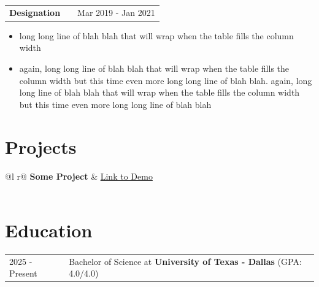 \documentclass[letterpaper,12pt]{article}
\makeatletter
\newenvironment{joblong}[2]
    {
    \begin{tabularx}{\linewidth}{@{}l X r@{}}
    \textbf{#1} & \hfill &  #2 \\[3.75pt]
    \end{tabularx}
    \begin{minipage}[t]{\linewidth}
    \begin{itemize}[nosep,after=\strut, leftmargin=1em, itemsep=3pt,label=--]
    }
    {
    \end{itemize}
    \end{minipage}    
    }
\makeatother
\begin{document}
\begin{joblong}{Designation}{Mar 2019 - Jan 2021}
\item long long line of blah blah that will wrap when the table fills the column width
\item again, long long line of blah blah that will wrap when the table fills the column width but this time even more long long line of blah blah. again, long long line of blah blah that will wrap when the table fills the column width but this time even more long long line of blah blah
\end{joblong}
  
\section{Projects}

\begin{tabularx}{\linewidth}{ @{}l r@{} }
\textbf{Some Project} & \hfill \href{https://some-link.com}{Link to Demo} \\[3.75pt]
  \\
\end{tabularx}

\section{Education}
\begin{tabularx}{\linewidth}{@{}l X@{}}	

2025 - Present & Bachelor of Science at \textbf{University of Texas - Dallas} \hfill (GPA: 4.0/4.0) \\ 


\end{tabularx}
\end{document}
